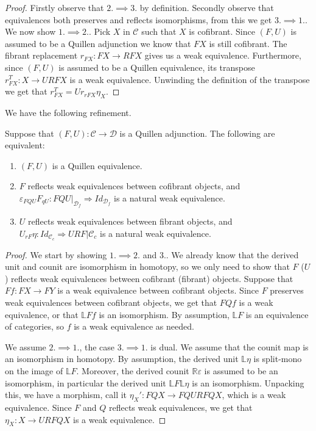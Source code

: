 \documentclass[../thesis.tex]{subfiles}
\begin{document}
            \begin{proof}
                Firstly observe that $2.\implies3.$ by definition. Secondly observe that equivalences both preserves and reflects isomorphisms, from this we get $3. \implies 1.$. We now show $1.\implies 2.$. Pick $X$ in $\mathcal{C}$ such that $X$ is cofibrant. Since $(F,U)$ is assumed to be a Quillen adjunction we know that $FX$ is still cofibrant. The fibrant replacement $r_{FX}:FX\rightarrow RFX$ gives us a weak equivalence. Furthermore, since $(F,U)$ is assumed to be a Quillen equivalence, its transpose $r_{FX}^T: X \rightarrow URFX$ is a weak equivalence. Unwinding the definition of the transpose we get that $r_{FX}^T = Ur_{rFX}\eta_X$.

            \end{proof}

            We have the following refinement.

            \begin{corollary}
                Suppose that $(F,U):\mathcal{C}\rightarrow\mathcal{D}$ is a Quillen adjunction. The following are equivalent:
                \begin{enumerate}
                    \item $(F,U)$ is a Quillen equivalence.
                    \item $F$ reflects weak equivalences between cofibrant objects, and $\varepsilon_{FQU}F_{qU} : FQU|_{\mathcal{D}_f} \Rightarrow Id_{\mathcal{D}_f}$ is a natural weak equivalence.
                    \item $U$ reflects weak equivalences between fibrant objects, and $U_{rF}\eta : Id_{\mathcal{C}_c} \Rightarrow URF|{\mathcal{C}_c}$ is a natural weak equivalence.
                \end{enumerate}
            \end{corollary}

            \begin{proof}
                We start by showing $1. \implies 2.$ and $3.$. We already know that the derived unit and counit are isomorphism in homotopy, so we only need to show that $F$ ($U$) reflects weak equivalences between cofibrant (fibrant) objects. Suppose that $Ff:FX\rightarrow FY$ is a weak equivalence between cofibrant objects. Since $F$ preserves weak equivalences between cofibrant objects, we get that $FQf$ is a weak equivalence, or that $\mathbb{L}Ff$ is an isomorphism. By assumption, $\mathbb{L}F$ is an equivalence of categories, so $f$ is a weak equivalence as needed.

                We assume $2.\implies 1.$, the case $3.\implies 1.$ is dual. We assume that the counit map is an isomorphism in homotopy. By assumption, the derived unit $\mathbb{L}\eta$ is split-mono on the image of $\mathbb{L}F$. Moreover, the derived counit $\mathbb{R}\varepsilon$ is assumed to be an isomorphism, in particular the derived unit $\mathbb{L}F\mathbb{L}\eta$ is an isomorphism. Unpacking this, we have a morphism, call it $\eta_X' : FQX \rightarrow FQURFQX$, which is a weak equivalence. Since $F$ and $Q$ reflects weak equivalences, we get that $\eta_X: X \rightarrow URFQX$ is a weak equivalence.
            \end{proof}
\end{document}
